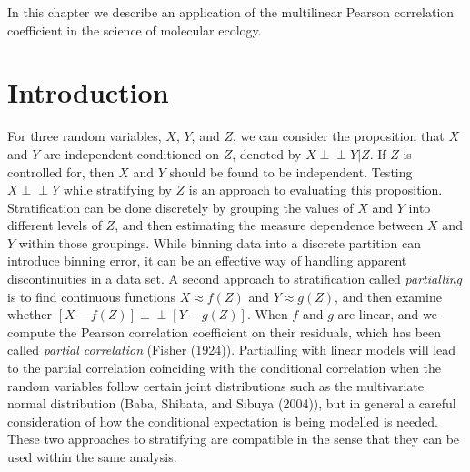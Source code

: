 \documentclass[
  letterpaper,
  DIV=11,
  numbers=noendperiod]{scrreprt}
\begin{document}
In this chapter we describe an application of the multilinear Pearson
correlation coefficient in the science of molecular ecology.

\section{Introduction}\label{introduction-1}

For three random variables, \(X\), \(Y\), and \(Z\), we can consider the
proposition that \(X\) and \(Y\) are independent conditioned on \(Z\),
denoted by \(X \perp\!\!\!\!\perp Y | Z\). If \(Z\) is controlled for,
then \(X\) and \(Y\) should be found to be independent. Testing
\(X \perp\!\!\!\!\perp Y\) while stratifying by \(Z\) is an approach to
evaluating this proposition. Stratification can be done discretely by
grouping the values of \(X\) and \(Y\) into different levels of \(Z\),
and then estimating the measure dependence between \(X\) and \(Y\)
within those groupings. While binning data into a discrete partition can
introduce binning error, it can be an effective way of handling apparent
discontinuities in a data set. A second approach to stratification
called \textit{partialling} is to find continuous functions
\(X \approx f(Z)\) and \(Y \approx g(Z)\), and then examine whether
\([X-f(Z)] \perp\!\!\!\!\perp [Y-g(Z)]\). When \(f\) and \(g\) are
linear, and we compute the Pearson correlation coefficient on their
residuals, which has been called \emph{partial correlation} (Fisher
(1924)). Partialling with linear models will lead to the partial
correlation coinciding with the conditional correlation when the random
variables follow certain joint distributions such as the multivariate
normal distribution (Baba, Shibata, and Sibuya (2004)), but in general a
careful consideration of how the conditional expectation is being
modelled is needed. These two approaches to stratifying are compatible
in the sense that they can be used within the same analysis.
\end{document}
